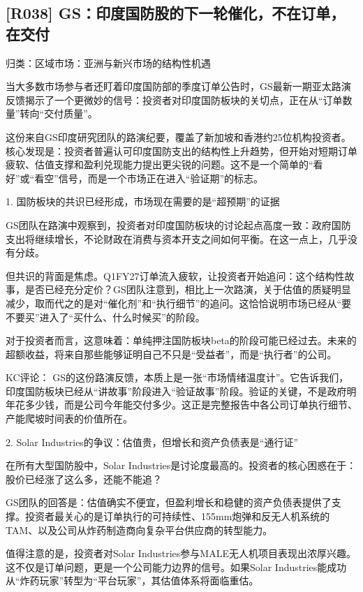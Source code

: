 \documentclass[11pt]{ctexart}
\begin{document}
\subsection{[R038] GS：印度国防股的下一轮催化，不在订单，在交付}
{\small\color{refgray}归类：区域市场：亚洲与新兴市场的结构性机遇}

当大多数市场参与者还盯着印度国防部的季度订单公告时，GS最新一期亚太路演反馈揭示了一个更微妙的信号：投资者对印度国防板块的关切点，正在从“订单数量”转向“交付质量”。

这份来自GS印度研究团队的路演纪要，覆盖了新加坡和香港约25位机构投资者。核心发现是：投资者普遍认可印度国防支出的结构性上升趋势，但开始对短期订单疲软、估值支撑和盈利兑现能力提出更尖锐的问题。这不是一个简单的“看好”或“看空”信号，而是一个市场正在进入“验证期”的标志。

1. 国防板块的共识已经形成，市场现在需要的是“超预期”的证据

GS团队在路演中观察到，投资者对印度国防板块的讨论起点高度一致：政府国防支出将继续增长，不论财政在消费与资本开支之间如何平衡。在这一点上，几乎没有分歧。

但共识的背面是焦虑。Q1FY27订单流入疲软，让投资者开始追问：这个结构性故事，是否已经充分定价？GS团队注意到，相比上一次路演，关于估值的质疑明显减少，取而代之的是对“催化剂”和“执行细节”的追问。这恰恰说明市场已经从“要不要买”进入了“买什么、什么时候买”的阶段。

对于投资者而言，这意味着：单纯押注国防板块beta的阶段可能已经过去。未来的超额收益，将来自那些能够证明自己不只是“受益者”，而是“执行者”的公司。

KC评论： GS的这份路演反馈，本质上是一张“市场情绪温度计”。它告诉我们，印度国防板块已经从“讲故事”阶段进入“验证故事”阶段。验证的关键，不是政府明年花多少钱，而是公司今年能交付多少。这正是完整报告中各公司订单执行细节、产能爬坡时间表的价值所在。

2. Solar Industries的争议：估值贵，但增长和资产负债表是“通行证”

在所有大型国防股中，Solar Industries是讨论度最高的。投资者的核心困惑在于：股价已经涨了这么多，还能不能追？

GS团队的回答是：估值确实不便宜，但盈利增长和稳健的资产负债表提供了支撑。投资者最关心的是订单执行的可持续性、155mm炮弹和反无人机系统的TAM、以及公司从炸药制造商向复杂平台供应商的转型能力。

值得注意的是，投资者对Solar Industries参与MALE无人机项目表现出浓厚兴趣。这不仅是订单问题，更是一个公司能力边界的信号。如果Solar Industries能成功从“炸药玩家”转型为“平台玩家”，其估值体系将面临重估。
\end{document}
